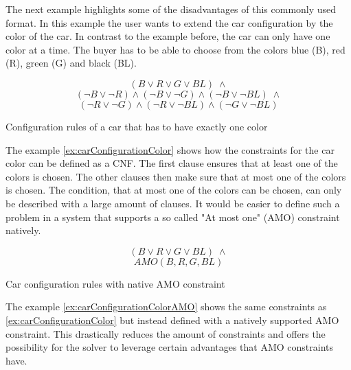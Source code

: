 The next example highlights some of the disadvantages of this commonly used format. In this example the user wants to extend the car configuration by the color of the car. In contrast to the example before, the car can only have one color at a time. The buyer has to be able to choose from the colors blue (B), red (R), green (G) and black (BL).
\begin{example}
\begin{leftbar}
\begin{displaymath}
(B \vee R \vee G \vee BL) \; \wedge
\end{displaymath}
\begin{displaymath}
(\neg B \vee \neg R) \wedge (\neg B \vee \neg G) \wedge (\neg B \vee \neg BL)\; \wedge
\end{displaymath}
\begin{displaymath}
(\neg R \vee \neg G) \wedge (\neg R \vee \neg BL) \wedge (\neg G \vee \neg BL)
\end{displaymath}
\end{leftbar}
\caption{Configuration rules of a car that has to have exactly one color}
\label{ex:carConfigurationColor}
\end{example}

The example \ref{ex:carConfigurationColor} shows how the constraints for the car color can be defined as a CNF. The first clause ensures that at least one of the colors is chosen. The other clauses then make sure that at most one of the colors is chosen. The condition, that at most one of the colors can be chosen, can only be described with a large amount of clauses. It would be easier to define such a problem in a system that supports a so called "At most one" (AMO) constraint natively.

\begin{example}
\begin{leftbar}
\begin{displaymath}
(B \vee R \vee G \vee BL) \; \wedge
\end{displaymath}
\begin{displaymath}
AMO(B,R,G,BL)
\end{displaymath}
\end{leftbar}
\caption{Car configuration rules with native AMO constraint}
\label{ex:carConfigurationColorAMO}
\end{example}

The example \ref{ex:carConfigurationColorAMO} shows the same constraints as \ref{ex:carConfigurationColor} but instead defined with a natively supported AMO constraint. This drastically reduces the amount of constraints and offers the possibility for the solver to leverage certain advantages that AMO constraints have.

